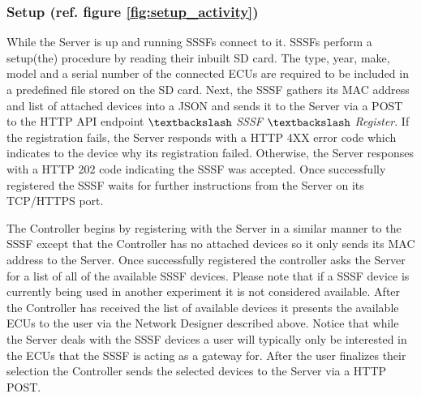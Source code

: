 \documentclass[letterpaper,twocolumn,10pt]{article}
\begin{document}
\subsubsection{Setup (ref. figure \ref{fig:setup_activity})}
While the Server is up and running SSSFs connect to it. SSSFs perform a setup(the) procedure by reading their inbuilt SD card. The type, year, make, model and a serial number of the connected ECUs are required to be included in a predefined file stored on the SD card. 
Next, the SSSF gathers its MAC address and list of attached devices into a JSON and sends it to the Server via a POST to the HTTP API endpoint $\textbackslash$ \textit{SSSF} $\textbackslash$ \textit{Register}. 
If the registration fails, the Server responds with a HTTP 4XX error code which indicates to the device why its registration failed. Otherwise, the Server responses with a HTTP 202 code indicating the SSSF was accepted. Once successfully registered the SSSF waits for further instructions from the Server on its TCP/HTTPS port. 

The Controller begins by registering with the Server in a similar manner to the SSSF except that the Controller has no attached devices so it only sends its MAC address to the Server.
Once successfully registered the controller asks the Server for a list of all of the available SSSF devices. Please note that if a SSSF device is currently being used in another experiment it is not considered available. After the Controller has received the list of available devices it presents the available ECUs to the user via the Network Designer described above. Notice that while the Server deals with the SSSF devices a user will typically only be interested in the ECUs that the SSSF is acting as a gateway for. After the user finalizes their selection the Controller sends the selected devices to the Server via a HTTP POST.
\end{document}
